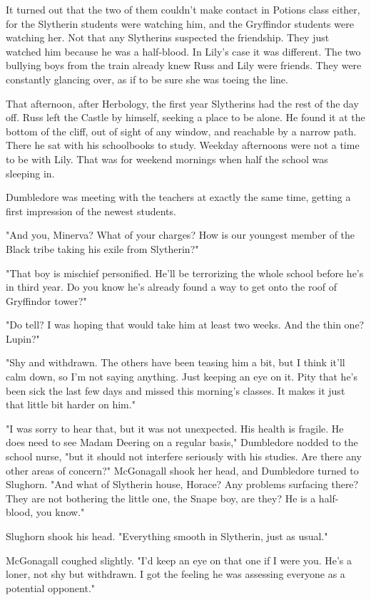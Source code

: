 \documentclass[a4paper,11pt]{article}
\begin{document}
It turned out that the two of them couldn't make contact in Potions class either, for the Slytherin students were watching him, and the Gryffindor students were watching her. Not that any Slytherins suspected the friendship. They just watched him because he was a half-blood. In Lily's case it was different. The two bullying boys from the train already knew Russ and Lily were friends. They were constantly glancing over, as if to be sure she was toeing the line.

That afternoon, after Herbology, the first year Slytherins had the rest of the day off. Russ left the Castle by himself, seeking a place to be alone. He found it at the bottom of the cliff, out of sight of any window, and reachable by a narrow path. There he sat with his schoolbooks to study. Weekday afternoons were not a time to be with Lily. That was for weekend mornings when half the school was sleeping in.

Dumbledore was meeting with the teachers at exactly the same time, getting a first impression of the newest students.

"And you, Minerva? What of your charges? How is our youngest member of the Black tribe taking his exile from Slytherin?"

"That boy is mischief personified. He'll be terrorizing the whole school before he's in third year. Do you know he's already found a way to get onto the roof of Gryffindor tower?"

"Do tell? I was hoping that would take him at least two weeks. And the thin one? Lupin?"

"Shy and withdrawn. The others have been teasing him a bit, but I think it'll calm down, so I'm not saying anything. Just keeping an eye on it. Pity that he's been sick the last few days and missed this morning's classes. It makes it just that little bit harder on him."

"I was sorry to hear that, but it was not unexpected. His health is fragile. He does need to see Madam Deering on a regular basis," Dumbledore nodded to the school nurse, "but it should not interfere seriously with his studies. Are there any other areas of concern?" McGonagall shook her head, and Dumbledore turned to Slughorn. "And what of Slytherin house, Horace? Any problems surfacing there? They are not bothering the little one, the Snape boy, are they? He is a half-blood, you know."

Slughorn shook his head. "Everything smooth in Slytherin, just as usual."

McGonagall coughed slightly. "I'd keep an eye on that one if I were you. He's a loner, not shy but withdrawn. I got the feeling he was assessing everyone as a potential opponent."
\end{document}
